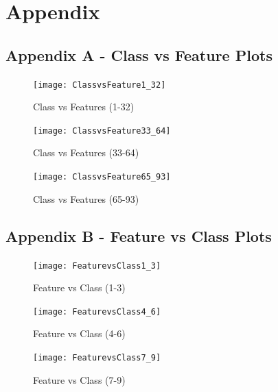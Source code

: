 \documentclass[a4paper, 12pt]{article}
\begin{document}
\pagebreak
\section*{Appendix}
\subsection*{Appendix A - Class vs Feature Plots}

		\begin{figure}[H]
            \centering 
            \texttt{[image: ClassvsFeature1\_32]}
            \caption{Class vs Features (1-32)}
            \label{fig:CF1_32}
		\end{figure}

		\begin{figure}[H]
            \centering 
            \texttt{[image: ClassvsFeature33\_64]}
            \caption{Class vs Features (33-64)}
            \label{fig:CF33_64}
		\end{figure}
        
		\begin{figure}[H]
            \centering 
            \texttt{[image: ClassvsFeature65\_93]}
            \caption{Class vs Features (65-93)}
            \label{fig:CF65_93}
		\end{figure}

\subsection*{Appendix B - Feature vs Class Plots}

		\begin{figure}[H]
            \centering 
            \texttt{[image: FeaturevsClass1\_3]}
            \caption{Feature vs Class (1-3)}
            \label{fig:FC1_3}
		\end{figure}

		\begin{figure}[H]
            \centering 
            \texttt{[image: FeaturevsClass4\_6]}
            \caption{Feature vs Class (4-6)}
            \label{fig:FC4_6}
		\end{figure}
        
		\begin{figure}[H]
            \centering 
            \texttt{[image: FeaturevsClass7\_9]}
            \caption{Feature vs Class (7-9)}
            \label{fig:FC7_9}
		\end{figure}
\end{document}
